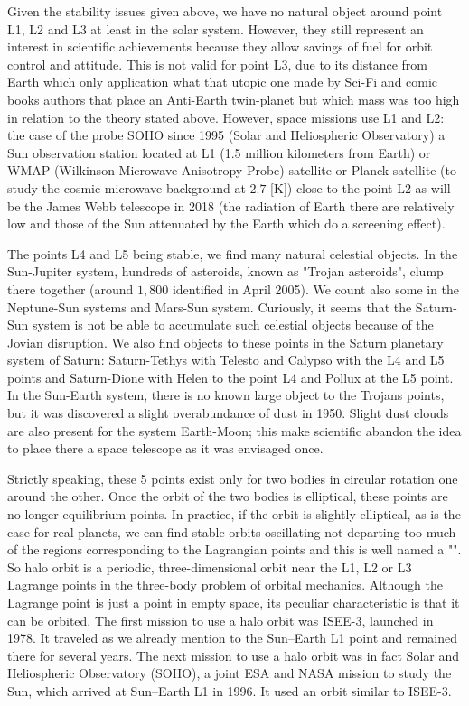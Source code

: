 	Given the stability issues given above, we have no natural object around point L1, L2 and L3 at least in the solar system. However, they still represent an interest in scientific achievements because they allow savings of fuel for orbit control and attitude. This is not valid for point L3, due to its distance from Earth which only application what that utopic one made by Sci-Fi and comic books authors that place an Anti-Earth twin-planet but which mass was too high in relation to the theory stated above. However, space missions use L1 and L2: the case of the probe SOHO since 1995 (Solar and Heliospheric Observatory) a Sun observation station located at L1 (1.5 million kilometers from Earth) or WMAP (Wilkinson Microwave Anisotropy Probe) satellite or Planck satellite (to study the cosmic microwave background at $2.7$ [K]) close to the point L2 as will be the James Webb telescope in 2018 (the radiation of Earth there are relatively low and those of the Sun attenuated by the Earth which do a screening effect).
	
	The points L4 and L5 being stable, we find many natural celestial objects. In the Sun-Jupiter system, hundreds of asteroids, known as "Trojan asteroids", clump there together (around $1,800$ identified in April 2005). We count also  some in the Neptune-Sun systems and Mars-Sun system. Curiously, it seems that the Saturn-Sun system is not be able to accumulate such celestial objects because of the Jovian disruption. We also find objects to these points in the Saturn planetary system of Saturn: Saturn-Tethys with Telesto and Calypso with the L4 and L5 points and Saturn-Dione with Helen to the point L4 and Pollux at the L5 point. In the Sun-Earth system, there is no known large object to the Trojans points, but it was discovered a slight overabundance of dust in 1950. Slight dust clouds are also present for the system Earth-Moon; this make scientific abandon the idea to place there a space telescope as it was envisaged once.
	
	Strictly speaking, these 5 points exist only for two bodies in circular rotation one around the other. Once the orbit of the two bodies is elliptical, these points are no longer equilibrium points. In practice, if the orbit is slightly elliptical, as is the case for real planets, we can find stable orbits oscillating not departing too much of the regions corresponding to the Lagrangian points and this is well named a "". So halo orbit is a periodic, three-dimensional orbit near the L1, L2 or L3 Lagrange points in the three-body problem of orbital mechanics. Although the Lagrange point is just a point in empty space, its peculiar characteristic is that it can be orbited. The first mission to use a halo orbit was ISEE-3, launched in 1978. It traveled as we already mention to the Sun–Earth L1 point and remained there for several years. The next mission to use a halo orbit was in fact Solar and Heliospheric Observatory (SOHO), a joint ESA and NASA mission to study the Sun, which arrived at Sun–Earth L1 in 1996. It used an orbit similar to ISEE-3.
	

